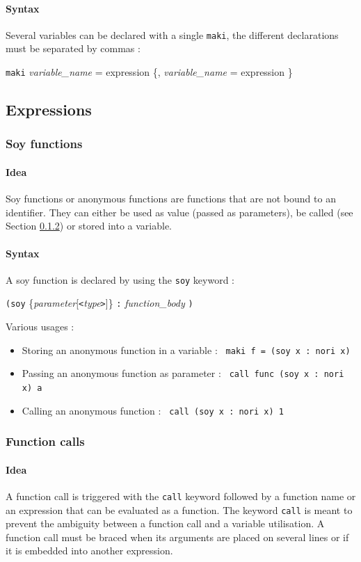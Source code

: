 \documentclass[a4paper,11pt]{article}
\begin{document}
\paragraph{Syntax} Several variables can be declared with a single \texttt{maki}, the different declarations must be separated by commas : 
\begin{center}
\texttt{maki} \textit{variable\_name} = expression \{, \textit{variable\_name} = expression \}
\end{center}
\subsection{Expressions}
\subsubsection{Soy functions}
\paragraph{Idea} Soy functions or anonymous functions are functions that are not bound to an identifier. They can either be used as value (passed as parameters), be called (see Section \ref{sssec:func_call}) or stored into a variable.
\paragraph{Syntax} A soy function is declared by using the \texttt{soy} keyword : 
\begin{center}
	\texttt{(soy} \{\textit{parameter}[\texttt{<}\textit{type}\texttt{>}]\} \texttt{:} \textit{function\_body} \texttt{)}
\end{center}
Various usages :
\begin{itemize}
	\item Storing an anonymous function in a variable : \texttt{ maki f = (soy x : nori x) }
	\item Passing an anonymous function as parameter : \texttt{ call func (soy x : nori x) a }
	\item Calling an anonymous function : \texttt{ call (soy x : nori x) 1 }
\end{itemize}
\label{sssec:soy_func}
\subsubsection{Function calls}
\label{sssec:func_call}
\paragraph{Idea} A function call is triggered with the \texttt{call} keyword followed by a function name or an expression that can be evaluated as a function.  The keyword \texttt{call} is meant to prevent the ambiguity between a function call and a variable utilisation. A function call must be braced when its arguments are placed on several lines or if it is embedded into another expression.
\end{document}
